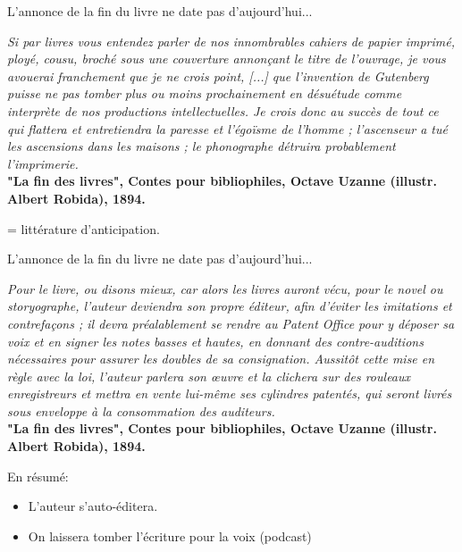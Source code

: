 \begin{frame}{L'annonce de la fin du livre ne date pas d'aujourd'hui...}
    \begin{block}{}
        \centering
        \small{\textit{Si par livres vous entendez parler de nos innombrables cahiers de papier imprimé, ployé, cousu, broché sous une couverture annonçant le titre de l’ouvrage, je vous avouerai franchement que je ne crois point, [...] que l’invention de Gutenberg puisse ne pas tomber plus ou moins prochainement en désuétude comme interprète de nos productions intellectuelles.
        Je crois donc au succès de tout ce qui flattera et entretiendra la paresse et l’égoïsme de l’homme ; l’ascenseur a tué les ascensions dans les maisons ; le phonographe détruira probablement l’imprimerie.}\\
        \textbf{"La fin des livres", Contes pour bibliophiles, Octave Uzanne (illustr. Albert Robida), 1894.}}
    \end{block}
    = littérature d'anticipation.
\end{frame}

\begin{frame}{L'annonce de la fin du livre ne date pas d'aujourd'hui...}
    \begin{block}{}
        \centering
        \small{\textit{Pour le livre, ou disons mieux, car alors les livres auront vécu, pour le novel ou storyographe, l’auteur deviendra son propre éditeur, afin d’éviter les imitations et contrefaçons ; il devra préalablement se rendre au Patent Office pour y déposer sa voix et en signer les notes basses et hautes, en donnant des contre-auditions nécessaires pour assurer les doubles de sa consignation. Aussitôt cette mise en règle avec la loi, l’auteur parlera son œuvre et la clichera sur des rouleaux enregistreurs et mettra en vente lui-même ses cylindres patentés, qui seront livrés sous enveloppe à la consommation des auditeurs.}\\
        \textbf{"La fin des livres", Contes pour bibliophiles, Octave Uzanne (illustr. Albert Robida), 1894.}}
    \end{block}

En résumé:
\begin{itemize}
    \item L'auteur s'auto-éditera.
    \item On laissera tomber l'écriture pour la voix (podcast)
\end{itemize}
\end{frame}